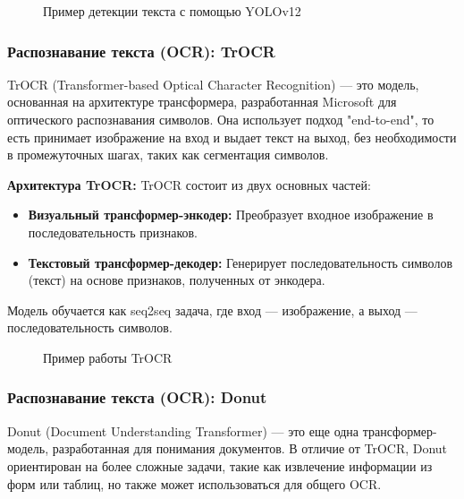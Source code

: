 \documentclass[12pt, a4paper]{article}
\theoremstyle{definition}
\theoremstyle{remark}
\begin{document}
	\begin{figure}[h!]
		\centering
		\caption{Пример детекции текста с помощью YOLOv12}
		\label{fig:yolo_detection}
	\end{figure}
	
	\subsubsection{Распознавание текста (OCR): TrOCR}
	TrOCR (Transformer-based Optical Character Recognition) — это модель, основанная на архитектуре трансформера, разработанная Microsoft для оптического распознавания символов. Она использует подход "end-to-end", то есть принимает изображение на вход и выдает текст на выход, без необходимости в промежуточных шагах, таких как сегментация символов.
	
	\textbf{Архитектура TrOCR:}
	TrOCR состоит из двух основных частей:
	\begin{itemize}
		\item \textbf{Визуальный трансформер-энкодер:} Преобразует входное изображение в последовательность признаков.
		\item \textbf{Текстовый трансформер-декодер:} Генерирует последовательность символов (текст) на основе признаков, полученных от энкодера.
	\end{itemize}
	Модель обучается как seq2seq задача, где вход — изображение, а выход — последовательность символов.
	
	\begin{figure}[h!]
		\centering
		\caption{Пример работы TrOCR}
		\label{fig:trocr_example}
	\end{figure}
	
	\subsubsection{Распознавание текста (OCR): Donut}
	Donut (Document Understanding Transformer) — это еще одна трансформер-модель, разработанная для понимания документов. В отличие от TrOCR, Donut ориентирован на более сложные задачи, такие как извлечение информации из форм или таблиц, но также может использоваться для общего OCR.
	
\end{document}
